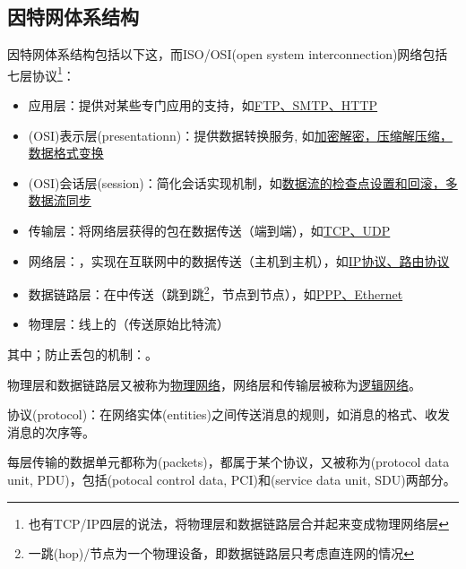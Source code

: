 \subsection{因特网体系结构}
因特网体系结构包括以下这，而ISO/OSI(open system interconnection)网络包括七层协议\footnote{也有TCP/IP四层的说法，将物理层和数据链路层合并起来变成物理网络层}：
\begin{itemize}
	\item 应用层：提供对某些专门应用的支持，如\underline{FTP、SMTP、HTTP}
	\item (OSI)表示层(presentationn)：提供数据转换服务, 如\underline{加密解密，压缩解压缩，数据格式变换}
	\item (OSI)会话层(session)：简化会话实现机制，如\underline{数据流的检查点设置和回滚，多数据流同步}
	\item 传输层：将网络层获得的包在数据传送（端到端），如\underline{TCP、UDP}
	\item 网络层：，实现在互联网中的数据传送（主机到主机），如\underline{IP协议、路由协议}
	\item 数据链路层：在中传送（跳到跳\footnote{一跳(hop)/节点为一个物理设备，即数据链路层只考虑直连网的情况}，节点到节点），如\underline{PPP、Ethernet}
	\item 物理层：线上的（传送原始比特流）
\end{itemize}
\par 其中；防止丢包的机制：。
\par 物理层和数据链路层又被称为\underline{物理网络}，网络层和传输层被称为\underline{逻辑网络}。

\myhline
协议(protocol)：在网络实体(entities)之间传送消息的规则，如消息的格式、收发消息的次序等。

每层传输的数据单元都称为(packets)，都属于某个协议，又被称为(protocol data unit, PDU)，包括(potocal control data, PCI)和(service data unit, SDU)两部分。

